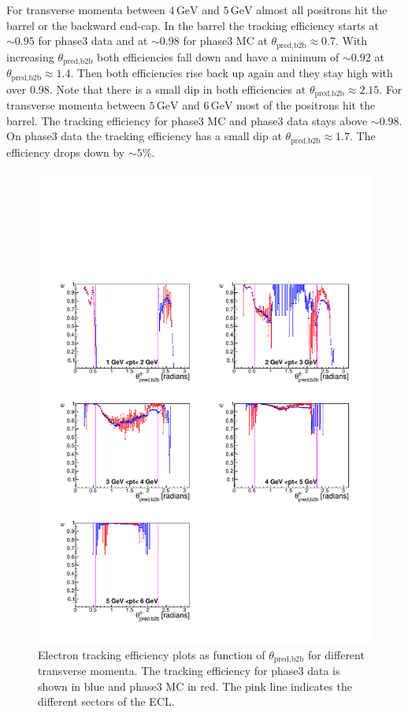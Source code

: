 \documentclass[a4paper,11pt,twosided,final,german,openbib,pdftex,listof=totoc,bibliography=totoc]{scrbook}
\begin{document}
For transverse momenta between $4\,\textrm{GeV}$ and $5\,\textrm{GeV}$ almost all positrons hit the barrel or the backward end-cap. In the barrel the tracking efficiency starts at $\sim 0.95$ for phase3 data and at $\sim 0.98$ for phase3 MC at $\theta_{\textrm{pred,b2b}} \approx 0.7$. With increasing $\theta_{\textrm{pred,b2b}}$ both efficiencies fall down and have a minimum of $\sim 0.92$ at $\theta_{\textrm{pred,b2b}} \approx 1.4$. Then both efficiencies rise back up again and they stay high with over 0.98. Note that there is a small dip in both efficiencies at $\theta_{\textrm{pred,b2b}} \approx 2.15$.
For transverse momenta between $5\,\textrm{GeV}$ and $6\,\textrm{GeV}$ most of the positrons hit the barrel. The tracking efficiency for phase3 MC and phase3 data stays above $\sim 0.98$. On phase3 data the tracking efficiency has a small dip at $\theta_{\textrm{pred,b2b}} \approx 1.7$. The efficiency drops down by $\sim 5\%$.


\begin{figure}[!htbp]
	\centering
	\includegraphics[width=\textwidth]{Plots/master3/xPtMThetaemP3}
	\caption[Transverse Momentum $\theta_{\textrm{pred,b2b}}$ Electron Efficiency Phase3]{Electron tracking efficiency plots as function of $\theta_{\textrm{pred,b2b}}$ for different transverse momenta. The tracking efficiency for phase3 data is shown in blue and phase3 MC in red. The pink line indicates the different sectors of the ECL.}
	
	\label{plt:xPtMThetaem3}
\end{figure}
\end{document}
